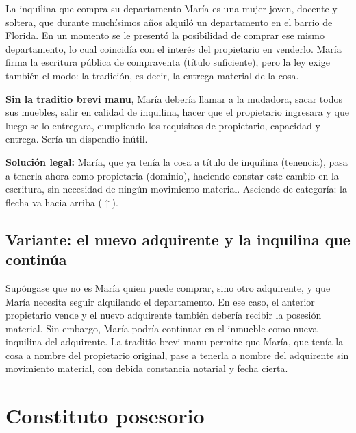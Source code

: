 \documentclass[12pt,oneside]{book}
\begin{document}
\begin{example}{La inquilina que compra su departamento}
María es una mujer joven, docente y soltera, que durante muchísimos años alquiló un departamento en el barrio de Florida. En un momento se le presentó la posibilidad de comprar ese mismo departamento, lo cual coincidía con el interés del propietario en venderlo. María firma la escritura pública de compraventa (título suficiente), pero la ley exige también el modo: la tradición, es decir, la entrega material de la cosa.

\textbf{Sin la traditio brevi manu}, María debería llamar a la mudadora, sacar todos sus muebles, salir en calidad de inquilina, hacer que el propietario ingresara y que luego se lo entregara, cumpliendo los requisitos de propietario, capacidad y entrega. Sería un dispendio inútil.

\textbf{Solución legal:} María, que ya tenía la cosa a título de inquilina (tenencia), pasa a tenerla ahora como propietaria (dominio), haciendo constar este cambio en la escritura, sin necesidad de ningún movimiento material. Asciende de categoría: la flecha va hacia arriba ($\uparrow$).
\end{example}

\subsection{Variante: el nuevo adquirente y la inquilina que continúa}


Supóngase que no es María quien puede comprar, sino otro adquirente, y que María necesita seguir alquilando el departamento. En ese caso, el anterior propietario vende y el nuevo adquirente también debería recibir la posesión material. Sin embargo, María podría continuar en el inmueble como nueva inquilina del adquirente. La traditio brevi manu permite que María, que tenía la cosa a nombre del propietario original, pase a tenerla a nombre del adquirente sin movimiento material, con debida constancia notarial y fecha cierta.

\section{Constituto posesorio}
\end{document}
